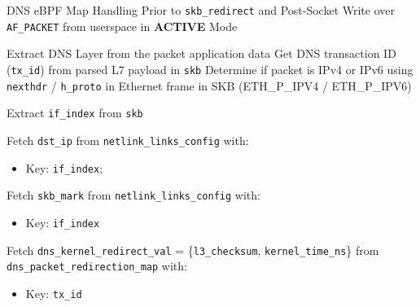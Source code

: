 \documentclass [11pt, proquest] {uwthesis}[2020/02/24]
\begin{document}
\begin{algorithm}[H]
\caption{DNS eBPF Map Handling Prior to \texttt{skb\_redirect} and Post-Socket Write over \texttt{AF\_PACKET} from userspace in \textbf{ACTIVE} Mode}
\label{sec:alg2}

\small %


Extract DNS Layer from the packet application data\;
Get DNS transaction ID (\texttt{tx\_id}) from parsed L7 payload in \texttt{skb}\;
Determine if packet is IPv4 or IPv6 using \texttt{nexthdr} / \texttt{h\_proto} in Ethernet frame in SKB (ETH\_P\_IPV4 / ETH\_P\_IPV6)\;

Extract \texttt{if\_index} from \texttt{skb}\;

Fetch \texttt{dst\_ip} from \texttt{netlink\_links\_config} with:
\begin{itemize}[nosep]
    \item Key: \texttt{if\_index};
\end{itemize}
Fetch \texttt{skb\_mark} from \texttt{netlink\_links\_config} with:
\begin{itemize}[nosep]
    \item Key: \texttt{if\_index}\;
\end{itemize}

Fetch \texttt{dns\_kernel\_redirect\_val} = \{\texttt{l3\_checksum}, \texttt{kernel\_time\_ns}\} from \texttt{dns\_packet\_redirection\_map} with:
\begin{itemize}[nosep]
    \item Key: \texttt{tx\_id}\;
\end{itemize}


\end{algorithm}
\end{document}
